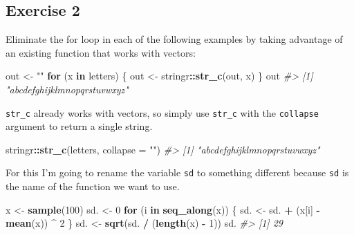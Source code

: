 \documentclass[]{book}
\newenvironment{Shaded}{\begin{snugshade}}{\end{snugshade}}
\newcommand{\CommentTok}[1]{\textcolor[rgb]{0.56,0.35,0.01}{\textit{#1}}}
\newcommand{\ControlFlowTok}[1]{\textcolor[rgb]{0.13,0.29,0.53}{\textbf{#1}}}
\newcommand{\DataTypeTok}[1]{\textcolor[rgb]{0.13,0.29,0.53}{#1}}
\newcommand{\DecValTok}[1]{\textcolor[rgb]{0.00,0.00,0.81}{#1}}
\newcommand{\KeywordTok}[1]{\textcolor[rgb]{0.13,0.29,0.53}{\textbf{#1}}}
\newcommand{\NormalTok}[1]{#1}
\newcommand{\OperatorTok}[1]{\textcolor[rgb]{0.81,0.36,0.00}{\textbf{#1}}}
\newcommand{\StringTok}[1]{\textcolor[rgb]{0.31,0.60,0.02}{#1}}
\theoremstyle{definition}
\theoremstyle{definition}
\theoremstyle{definition}
\theoremstyle{remark}
\begin{document}
\hypertarget{exercise-2-51}{%
\subsection{Exercise 2}\label{exercise-2-51}}

Eliminate the for loop in each of the following examples by taking
advantage of an existing function that works with vectors:

\begin{Shaded}
\begin{Highlighting}[]
\NormalTok{out <-}\StringTok{ ""}
\ControlFlowTok{for}\NormalTok{ (x }\ControlFlowTok{in}\NormalTok{ letters) \{}
\NormalTok{  out <-}\StringTok{ }\NormalTok{stringr}\OperatorTok{::}\KeywordTok{str_c}\NormalTok{(out, x)}
\NormalTok{\}}
\NormalTok{out}
\CommentTok{#> [1] "abcdefghijklmnopqrstuvwxyz"}
\end{Highlighting}
\end{Shaded}

\texttt{str\_c} already works with vectors, so simply use
\texttt{str\_c} with the \texttt{collapse} argument to return a single
string.

\begin{Shaded}
\begin{Highlighting}[]
\NormalTok{stringr}\OperatorTok{::}\KeywordTok{str_c}\NormalTok{(letters, }\DataTypeTok{collapse =} \StringTok{""}\NormalTok{)}
\CommentTok{#> [1] "abcdefghijklmnopqrstuvwxyz"}
\end{Highlighting}
\end{Shaded}

For this I'm going to rename the variable \texttt{sd} to something
different because \texttt{sd} is the name of the function we want to
use.

\begin{Shaded}
\begin{Highlighting}[]
\NormalTok{x <-}\StringTok{ }\KeywordTok{sample}\NormalTok{(}\DecValTok{100}\NormalTok{)}
\NormalTok{sd. <-}\StringTok{ }\DecValTok{0}
\ControlFlowTok{for}\NormalTok{ (i }\ControlFlowTok{in} \KeywordTok{seq_along}\NormalTok{(x)) \{}
\NormalTok{  sd. <-}\StringTok{ }\NormalTok{sd. }\OperatorTok{+}\StringTok{ }\NormalTok{(x[i] }\OperatorTok{-}\StringTok{ }\KeywordTok{mean}\NormalTok{(x)) }\OperatorTok{^}\StringTok{ }\DecValTok{2}
\NormalTok{\}}
\NormalTok{sd. <-}\StringTok{ }\KeywordTok{sqrt}\NormalTok{(sd. }\OperatorTok{/}\StringTok{ }\NormalTok{(}\KeywordTok{length}\NormalTok{(x) }\OperatorTok{-}\StringTok{ }\DecValTok{1}\NormalTok{))}
\NormalTok{sd.}
\CommentTok{#> [1] 29}
\end{Highlighting}
\end{Shaded}
\end{document}
